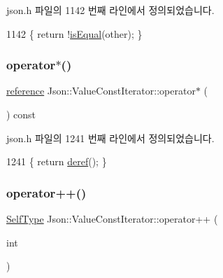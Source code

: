 json.\+h 파일의 1142 번째 라인에서 정의되었습니다.


\begin{DoxyCode}
1142 \{ \textcolor{keywordflow}{return} !\hyperlink{class_json_1_1_value_iterator_base_a010b5ad3f3337ae3732e5d7e16ca5e25}{isEqual}(other); \}
\end{DoxyCode}
\mbox{\label{class_json_1_1_value_const_iterator_ae5612dad47a6387eef71d584fb741d0c}} 
\subsubsection{\texorpdfstring{operator$\ast$()}{operator*()}}
{\footnotesize\ttfamily \hyperlink{class_json_1_1_value_const_iterator_aa9b05c6a37cd352ea1ee6e13b816f709}{reference} Json\+::\+Value\+Const\+Iterator\+::operator$\ast$ (\begin{DoxyParamCaption}{ }\end{DoxyParamCaption}) const\hspace{0.3cm}{\ttfamily [inline]}}



json.\+h 파일의 1241 번째 라인에서 정의되었습니다.


\begin{DoxyCode}
1241 \{ \textcolor{keywordflow}{return} \hyperlink{class_json_1_1_value_iterator_base_aa5b75c9514a30ba2ea3c9a35c165c18e}{deref}(); \}
\end{DoxyCode}
\mbox{\label{class_json_1_1_value_const_iterator_ab3f0c2edbfc8f7d60645f3d597d05e28}} 
\subsubsection{\texorpdfstring{operator++()}{operator++()}\hspace{0.1cm}{\footnotesize\ttfamily [1/2]}}
{\footnotesize\ttfamily \hyperlink{class_json_1_1_value_iterator_base_a9d2a940d03ea06d20d972f41a89149ee}{Self\+Type} Json\+::\+Value\+Const\+Iterator\+::operator++ (\begin{DoxyParamCaption}\item[{int}]{ }\end{DoxyParamCaption})\hspace{0.3cm}{\ttfamily [inline]}}



